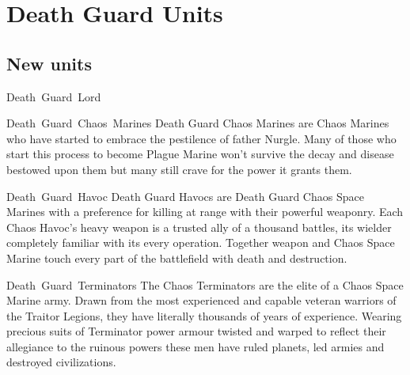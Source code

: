 \documentclass[a4paper, twocolumn]{article}
\begin{document}
%
\clearpage \onecolumn
\section{Death Guard Units}

\subsection{New units}

\unit{Death Guard Lord}{}
\statsEND

\unit{Death Guard Chaos Marines}{
  Death Guard Chaos Marines are Chaos Marines who have started to embrace the pestilence of father Nurgle. Many of
  those who start this process to become Plague Marine won't survive the decay and disease bestowed upon them
  but many still crave for the power it grants them.
}
\statsEND

\unit{Death Guard Havoc} {
  Death Guard Havocs are Death Guard Chaos Space Marines with a preference for killing at range with their powerful weaponry. Each
  Chaos Havoc's heavy weapon is a trusted ally of a thousand battles, its wielder completely familiar with its every operation.
  Together weapon and Chaos Space Marine touch every part of the battlefield with death and destruction.
}
\statsEND

\unit{Death Guard Terminators} {
  The Chaos Terminators are the elite of a Chaos Space Marine army. Drawn from the most experienced and capable veteran warriors of
  the Traitor Legions, they have literally thousands of years of experience. Wearing precious suits of Terminator power armour
  twisted and warped to reflect their allegiance to the ruinous powers these men have ruled planets, led armies and destroyed
  civilizations.
}
\statsEND
\end{document}

